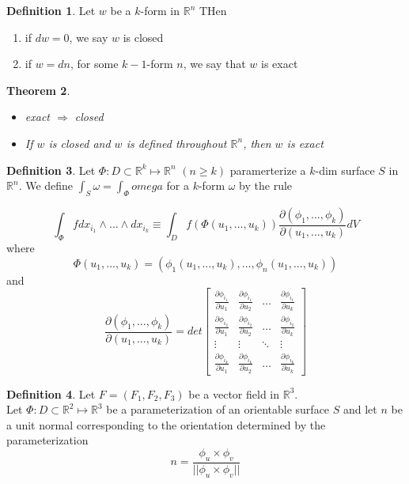 \documentclass[12pt]{article}
\theoremstyle{plain}
\newtheorem{theorem}{Theorem}[section]
\theoremstyle{definition}
\newtheorem{definition}[theorem]{Definition}
\begin{document}
\begin{definition}
    Let $w$ be a $k$-form in $\mathbb{R}^n$ THen
    \begin{enumerate}
        \item{if $dw = 0$, we say $w$ is closed}
        \item{if $w=dn$, for some $k-1$-form $n$, we say that $w$ is exact}
    \end{enumerate}
\end{definition}

\begin{theorem}
    \begin{itemize}
        \item{exact $\Longrightarrow$ closed}
        \item{If $w$ is closed and $w$ is defined throughout $\mathbb{R}^n$, then $w$ is exact}
    \end{itemize}
\end{theorem}

\begin{definition}
    Let $\Phi : D \subset \mathbb{R}^k \mapsto\mathbb{R}^n$ $(n \geq  k)$ paramerterize a $k$-dim surface $S$ in $\mathbb{R}^n$. We define $\int_S \omega = \int_\Phi omega$ for a $k$-form $\omega$ by the rule

    $$\int_\Phi f dx_{i_1} \wedge ... \wedge dx_{i_k} \equiv \int_D f(\Phi (u_1,..., u_k)) \frac{\partial (\phi_1,..., \phi_k)}{\partial (u_1,..., u_k)} dV$$
    where
    $$\Phi (u_1,..., u_k) = (\phi_1 (u_1,..., u_k), ..., \phi_n (u_1,..., u_k))$$
    and
    $$\frac{\partial (\phi_1,..., \phi_k)}{\partial (u_1,..., u_k)} = det\begin{bmatrix}
    \frac{\partial \phi_{i_1}}{\partial u_1} & \frac{\partial \phi_{i_1}}{\partial u_2} & \dots  & \frac{\partial \phi_{i_1}}{\partial u_k} \\
    \frac{\partial \phi_{i_2}}{\partial u_1} & \frac{\partial \phi_{i_2}}{\partial u_2} & \dots  & \frac{\partial \phi_{i_2}}{\partial u_k} \\
    \vdots & \vdots & \ddots & \vdots \\
    \frac{\partial \phi_{i_k}}{\partial u_1} & \frac{\partial \phi_{i_k}}{\partial u_2} & \dots  & \frac{\partial \phi_{i_k}}{\partial u_k}
\end{bmatrix}$$
\end{definition}

\begin{definition}
    Let $F = (F_1, F_2, F_3)$ be a vector field in $\mathbb{R}^3$.\\
    Let $\Phi : D \subset \mathbb{R}^2 \mapsto \mathbb{R}^3$ be a parameterization of an orientable surface $S$ and let $n$ be a unit normal corresponding to the orientation determined by the parameterization
    $$n = \frac{\phi_u \times \phi_v}{||\phi_u \times \phi_v||}$$
\end{definition}
\end{document}
